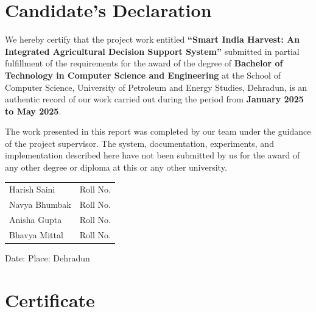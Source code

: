\documentclass[12pt,a4paper]{report}
\begin{document}
\chapter*{Candidate's Declaration}
\thispagestyle{fancy}
\doublespacing

We hereby certify that the project work entitled \textbf{``Smart India Harvest: An Integrated Agricultural Decision Support System''} submitted in partial fulfillment of the requirements for the award of the degree of \textbf{Bachelor of Technology in Computer Science and Engineering} at the School of Computer Science, University of Petroleum and Energy Studies, Dehradun, is an authentic record of our work carried out during the period from \textbf{January 2025 to May 2025}.

The work presented in this report was completed by our team under the guidance of the project supervisor. The system, documentation, experiments, and implementation described here have not been submitted by us for the award of any other degree or diploma at this or any other university.

\vspace{1.8cm}

\begin{flushright}
\begin{tabular}{p{6cm}p{5cm}}
Harish Saini & Roll No. \underline{\hspace{2.8cm}} \\[8pt]
Navya Bhumbak & Roll No. \underline{\hspace{2.8cm}} \\[8pt]
Anisha Gupta & Roll No. \underline{\hspace{2.8cm}} \\[8pt]
Bhavya Mittal & Roll No. \underline{\hspace{2.8cm}} \\
\end{tabular}
\end{flushright}

\vspace{1.4cm}
\noindent Date: \underline{\hspace{3cm}} \hfill Place: Dehradun

\singlespacing

\chapter*{Certificate}
\thispagestyle{fancy}
\doublespacing
\end{document}
